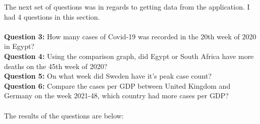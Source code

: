 \documentclass{report}
\begin{document}
\newpage
The next set of questions was in regards to getting data from the application. I had 4 questions in this section. \\ \\
\textbf{Question 3: }How many cases of Covid-19 was recorded in the 20th week of 2020 in Egypt? \\
\textbf{Question 4: }Using the comparison graph, did Egypt or South Africa have more deaths on the 45th week of 2020?\\
\textbf{Question 5: }On what week did Sweden have it's peak case count?\\
\textbf{Question 6: }Compare the cases per GDP between United Kingdom and Germany on the week 2021-48, which country had more cases per GDP? \\ \\
The results of the questions are below:\\
\noindent
\begin{minipage}[t]{0.45\textwidth}
    \centering
\end{minipage}
\hfill
\begin{minipage}[t]{0.35\textwidth}
    \centering
\end{minipage}
\vspace{1cm}
\begin{minipage}[t]{0.45\textwidth}
    \centering
\end{minipage}
\hfill
\begin{minipage}[t]{0.35\textwidth}
    \centering
\end{minipage}
\end{document}
